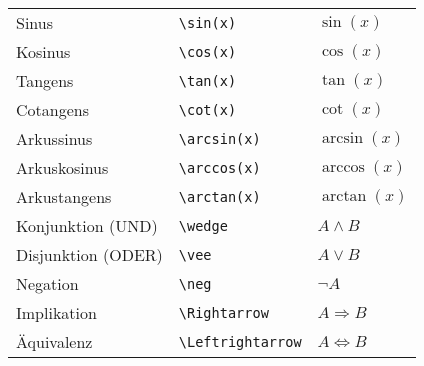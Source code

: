 \begin{longtable}{l l l}
    \midrule
    Sinus                     & \texttt{\textbackslash sin{(x)}}                                                        & $ \sin{(x)} $                        \\
    Kosinus                   & \texttt{\textbackslash cos{(x)}}                                                        & $ \cos{(x)} $                        \\
    Tangens                   & \texttt{\textbackslash tan{(x)}}                                                        & $ \tan{(x)} $                        \\
    Cotangens                 & \texttt{\textbackslash cot{(x)}}                                                        & $ \cot{(x)} $                        \\
    Arkussinus                & \texttt{\textbackslash arcsin{(x)}}                                                     & $ \arcsin{(x)} $                     \\
    Arkuskosinus              & \texttt{\textbackslash arccos{(x)}}                                                     & $ \arccos{(x)} $                     \\
    Arkustangens              & \texttt{\textbackslash arctan{(x)}}                                                     & $ \arctan{(x)} $                     \\

    \midrule
    Konjunktion (UND)         & \texttt{\textbackslash wedge}                                                           & $ A \wedge B $                       \\
    Disjunktion (ODER)        & \texttt{\textbackslash vee}                                                             & $ A \vee B $                         \\
    Negation                  & \texttt{\textbackslash neg}                                                             & $ \neg A $                           \\
    Implikation               & \texttt{\textbackslash Rightarrow}                                                      & $ A \Rightarrow B $                  \\
    Äquivalenz                & \texttt{\textbackslash Leftrightarrow}                                                  & $ A \Leftrightarrow B $              \\


\end{longtable}
